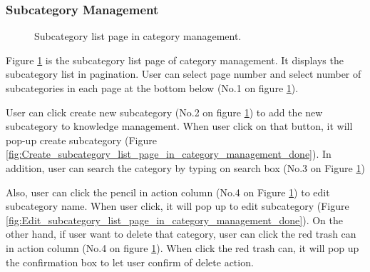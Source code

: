 \documentclass[12pt,oneside,openright,a4paper]{cpe-english-project}
\begin{document}
		\subsubsection{Subcategory Management}
		\begin{figure}[!h]\centering
			\caption{Subcategory list page in category management.}\label{fig:Subcategory_list_page_in_category_management_done}
		\end{figure}
		\begin{flushleft}
			Figure \ref*{fig:Subcategory_list_page_in_category_management_done} is the subcategory list page of category management. It displays the subcategory list in pagination. User can select page number and select number of subcategories in each page at the bottom below (No.1 on figure \ref*{fig:Subcategory_list_page_in_category_management_done}).
		\end{flushleft}
		\begin{flushleft}
			User can click create new subcategory (No.2 on figure \ref*{fig:Subcategory_list_page_in_category_management_done}) to add the new subcategory to knowledge management. When user click on that button, it will pop-up create subcategory (Figure \ref*{fig:Create_subcategory_list_page_in_category_management_done}). In addition, user can search the category by typing on search box (No.3 on Figure \ref*{fig:Subcategory_list_page_in_category_management_done})
		\end{flushleft}
		\begin{flushleft}
			Also, user can click the pencil in action column (No.4 on Figure \ref*{fig:Subcategory_list_page_in_category_management_done}) to edit subcategory name. When user click, it will pop up to edit subcategory (Figure \ref*{fig:Edit_subcategory_list_page_in_category_management_done}). On the other hand, if user want to delete that category, user can click the red trash can in action column (No.4 on figure \ref*{fig:Subcategory_list_page_in_category_management_done}). When click the red trash can, it will pop up the confirmation box to let user confirm of delete action.
		\end{flushleft}
\end{document}
